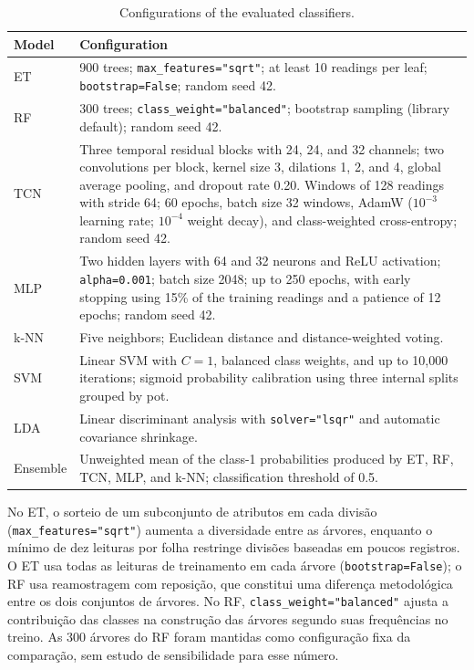 \begin{table}[H]
\centering
\footnotesize
\caption{Configurations of the evaluated classifiers.}
\label{tab:configuracao_modelos}
\begin{tabularx}{\textwidth}{@{}p{1.35cm}X@{}}
\toprule
\textbf{Model} & \textbf{Configuration} \\
\midrule
ET & 900 trees; \texttt{max\_features="sqrt"}; at least 10 readings per
leaf; \texttt{bootstrap=False}; random seed 42. \\
RF & 300 trees; \texttt{class\_weight="balanced"}; bootstrap sampling
(library default); random seed 42. \\
TCN & Three temporal residual blocks with 24, 24, and 32 channels; two
convolutions per block, kernel size 3, dilations 1, 2, and 4, global
average pooling, and dropout rate 0.20. Windows of 128
readings with stride 64; 60 epochs, batch size 32 windows, AdamW
($10^{-3}$ learning rate; $10^{-4}$ weight decay), and class-weighted
cross-entropy; random seed 42. \\
MLP & Two hidden layers with 64 and 32 neurons and ReLU activation;
\texttt{alpha=0.001}; batch size 2048; up to 250 epochs, with early stopping
using 15\% of the training readings and a patience of 12 epochs;
random seed 42. \\
k-NN & Five neighbors; Euclidean distance and distance-weighted voting. \\
SVM & Linear SVM with $C=1$, balanced class weights, and up to 10,000
iterations; sigmoid probability calibration using three internal splits
grouped by pot. \\
LDA & Linear discriminant analysis with \texttt{solver="lsqr"} and
automatic covariance shrinkage. \\
Ensemble & Unweighted mean of the class-1 probabilities produced by ET, RF,
TCN, MLP, and k-NN; classification threshold of 0.5. \\
\bottomrule
\end{tabularx}
\end{table}

No ET, o sorteio de um subconjunto de atributos em cada divisão
(\texttt{max\_features="sqrt"}) aumenta a diversidade entre as árvores,
enquanto o mínimo de dez leituras por folha restringe divisões baseadas
em poucos registros. O ET usa todas as leituras de treinamento em cada
árvore (\texttt{bootstrap=False}); o RF usa reamostragem com reposição,
que constitui uma diferença metodológica entre os dois conjuntos de
árvores. No RF, \texttt{class\_weight="balanced"} ajusta a contribuição
das classes na construção das árvores segundo suas frequências no treino.
As 300 árvores do RF foram mantidas como configuração fixa da comparação,
sem estudo de sensibilidade para esse número.


